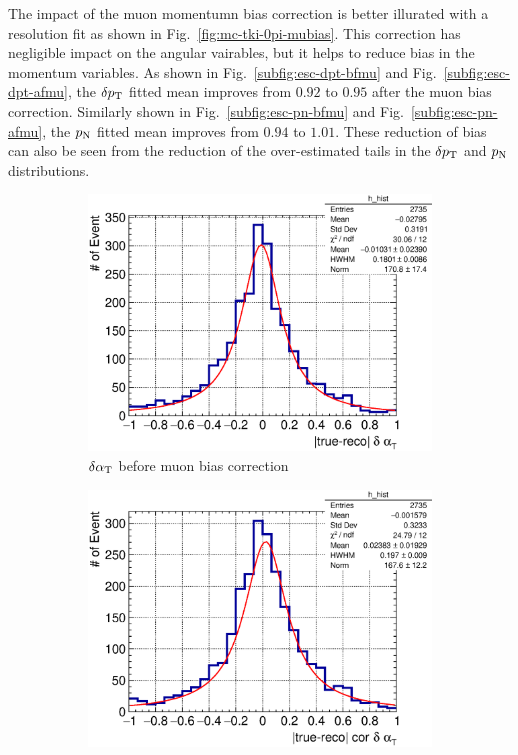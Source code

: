      The impact of the muon momentumn bias correction is better illurated with a resolution fit as shown in Fig.~\ref{fig:mc-tki-0pi-mubias}. 
     This correction has negligible impact on the angular vairables, but it helps to reduce bias in the momentum variables.
     As shown in Fig.~\ref{subfig:esc-dpt-bfmu} and Fig.~\ref{subfig:esc-dpt-afmu}, the $\delta p_\textrm{T}$ fitted mean improves from $0.92$ to $0.95$ after the muon bias correction.
     Similarly shown in Fig.~\ref{subfig:esc-pn-bfmu} and Fig.~\ref{subfig:esc-pn-afmu}, the $p_\textrm{N}$ fitted mean improves from $0.94$ to $1.01$.
     These reduction of bias can also be seen from the reduction of the over-estimated tails in the $\delta p_\textrm{T}$ and $p_\textrm{N}$ distributions.
     \begin{figure}
          \begin{subfigure}[b]{\dbfigwid\textwidth}
               \centering
               \includegraphics[width=\textwidth]{figures/perf/tki/dalphat_rat_hist_al14.eps}
               \caption{$\delta\alpha_\textrm{T}$ before muon bias correction}
               \label{subfig:esc-dalpha-bfmu}
          \end{subfigure}         
          \begin{subfigure}[b]{\dbfigwid\textwidth}
               \centering
               \includegraphics[width=\textwidth]{figures/perf/tki/cor_dalphat_rat_hist_al14.eps}

\end{subfigure}
\end{figure}
